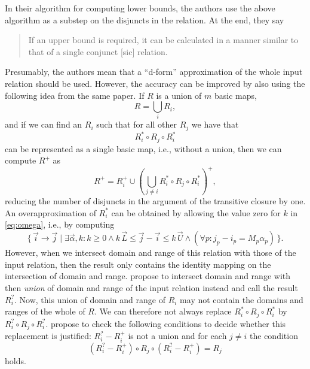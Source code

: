 In their algorithm for computing lower bounds, the authors
use the above algorithm as a substep on the disjuncts in the relation.
At the end, they say
\begin{quote}
If an upper bound is required, it can be calculated in a manner
similar to that of a single conjunct [sic] relation.
\end{quote}
Presumably, the authors mean that a ``d-form'' approximation
of the whole input relation should be used.
However, the accuracy can be improved by also using the following
idea from the same paper.  If $R$ is a union of $m$ basic maps,
$$
R = \bigcup_i R_i
,
$$
and if we can find an $R_i$ such that for all other $R_j$ we have
that
$$
R_i^* \circ R_j \circ R_i^*
$$
can be represented as a single basic map, i.e., without a union,
then we can compute $R^+$ as
$$
R^+ = R_i^+ \cup
\left(
\bigcup_{j \ne i}
R_i^* \circ R_j \circ R_i^*
\right)^+
,
$$
reducing the number of disjuncts in the argument of the transitive
closure by one.
An overapproximation of $R_i^*$ can be obtained by
allowing the value zero for $k$ in \eqref{eq:omega},
i.e., by computing
$$
\{\, \vec i \to \vec j \mid \exists \vec \alpha, k :
k \ge 0 \wedge
k \, \vec L \le \vec j - \vec i \le k \, \vec U
\wedge
(\forall p : j_p - i_p = M_p \alpha_p)
\,\}
.
$$
However, when we intersect domain and range of this relation
with those of the input relation, then the result only contains
the identity mapping on the intersection of domain and range.
 propose to intersect domain
and range with then {\em union} of domain and range of the input
relation instead and call the result $R_i^?$.
Now, this union of domain and range of $R_i$ may not contain
the domains and ranges of the whole of $R$.
We can therefore not always replace
$R_i^* \circ R_j \circ R_i^*$ by
$R_i^? \circ R_j \circ R_i^?$.
 propose to check the following
conditions to decide whether this replacement is justified:
$R_i^? - R_i^+$ is not a union and for each $j \ne i$
the condition
$$
\left(R_i^? - R_i^+\right)
\circ
R_j
\circ
\left(R_i^? - R_i^+\right)
=
R_j
$$
holds.
